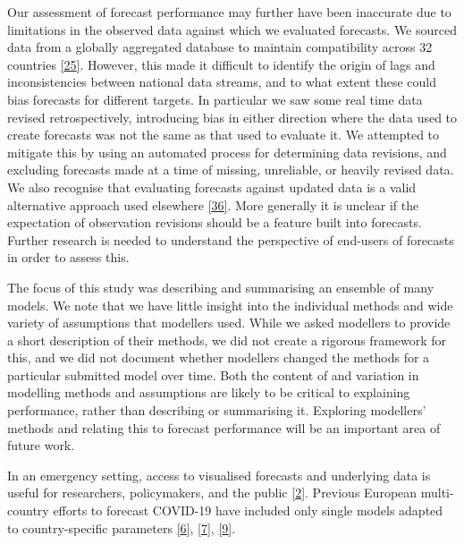 \documentclass[
]{article}
\begin{document}
Our assessment of forecast performance may further have been inaccurate due to limitations in the observed data against which we evaluated forecasts. We sourced data from a globally aggregated database to maintain compatibility across 32 countries \protect\hyperlink{ref-dongInteractiveWebbasedDashboard2020}{{[}25{]}}. However, this made it difficult to identify the origin of lags and inconsistencies between national data streams, and to what extent these could bias forecasts for different targets. In particular we saw some real time data revised retrospectively, introducing bias in either direction where the data used to create forecasts was not the same as that used to evaluate it. We attempted to mitigate this by using an automated process for determining data revisions, and excluding forecasts made at a time of missing, unreliable, or heavily revised data. We also recognise that evaluating forecasts against updated data is a valid alternative approach used elsewhere \protect\hyperlink{ref-cramerEvaluationIndividualEnsemble2021}{{[}36{]}}. More generally it is unclear if the expectation of observation revisions should be a feature built into forecasts. Further research is needed to understand the perspective of end-users of forecasts in order to assess this.

The focus of this study was describing and summarising an ensemble of many models. We note that we have little insight into the individual methods and wide variety of assumptions that modellers used. While we asked modellers to provide a short description of their methods, we did not create a rigorous framework for this, and we did not document whether modellers changed the methods for a particular submitted model over time. Both the content of and variation in modelling methods and assumptions are likely to be critical to explaining performance, rather than describing or summarising it. Exploring modellers' methods and relating this to forecast performance will be an important area of future work.

In an emergency setting, access to visualised forecasts and underlying data is useful for researchers, policymakers, and the public \protect\hyperlink{ref-cdcCoronavirusDisease20192020}{{[}2{]}}. Previous European multi-country efforts to forecast COVID-19 have included only single models adapted to country-specific parameters \protect\hyperlink{ref-aguasModellingCOVID19Pandemic2020}{{[}6{]}}, \protect\hyperlink{ref-adibParticipatoryModellingApproach2021}{{[}7{]}}, \protect\hyperlink{ref-agostoMonitoringCOVID19Contagion2021}{{[}9{]}}.
\end{document}
